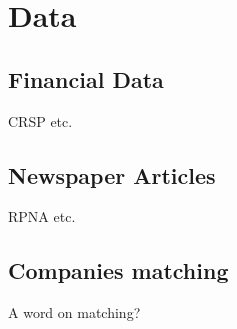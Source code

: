 \section{Data}
\subsection{Financial Data}
CRSP etc.

\subsection{Newspaper Articles}
RPNA etc.

\subsection{Companies matching}
A word on matching?